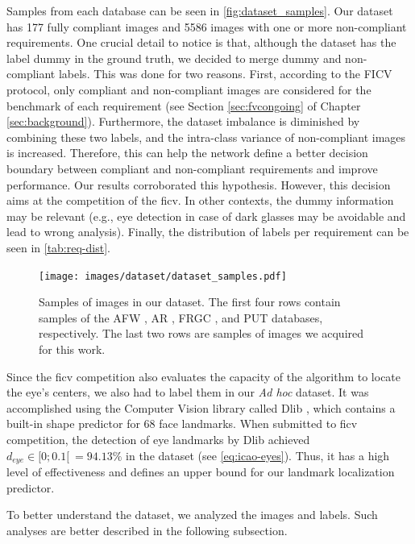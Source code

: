 Samples from each database can be seen in \autoref{fig:dataset_samples}. Our dataset has 177 fully compliant images and 5586 images with one or more non-compliant requirements. One crucial detail to notice is that, although the \adhoc dataset has the label dummy in the ground truth, we decided to merge dummy and non-compliant labels. This was done for two reasons. First, according to the FICV protocol, only compliant and non-compliant images are considered for the benchmark of each requirement (see Section \ref{sec:fvcongoing} of Chapter \ref{sec:background}). Furthermore, the dataset imbalance is diminished by combining these two labels, and the intra-class variance of non-compliant images is increased. Therefore, this can help the network define a better decision boundary between compliant and non-compliant requirements and improve performance. Our results corroborated this hypothesis. However, this decision aims at the competition of the \acs{ficv}. In other contexts, the dummy information may be relevant (e.g., eye detection in case of dark glasses may be avoidable and lead to wrong analysis). Finally, the distribution of labels per requirement can be seen in \autoref{tab:req-dist}. 
 
\begin{figure}[tb]
\centering
\texttt{[image: images/dataset/dataset\_samples.pdf]}
\caption{Samples of images in our dataset. The first four rows contain samples of the AFW \citep{databaseAFW}, AR \citep{martinez1998ar}, FRGC \citep{databaseFRGC}, and PUT \citep{kasinski2008put} databases, respectively. The last two rows are samples of images we acquired for this work.}
\label{fig:dataset_samples}
\end{figure}
 

 
Since the \acs{ficv} competition also evaluates the capacity of the algorithm to locate the eye's centers, we also had to label them in our \textit{Ad hoc} dataset. It was accomplished using the Computer Vision library called Dlib \citep{dlib}, which contains a built-in shape predictor for 68 face landmarks. When submitted to \acs{ficv} competition, the detection of eye landmarks by Dlib achieved $d_{eye} \in [0;0.1[\ = 94.13\%$ in the \ficvtest dataset (see \autoref{eq:icao-eyes}). Thus, it has a high level of effectiveness and defines an upper bound for our landmark localization predictor.
 
To better understand the \adhoc dataset, we analyzed the images and labels. Such analyses are better described in the following subsection.
 
